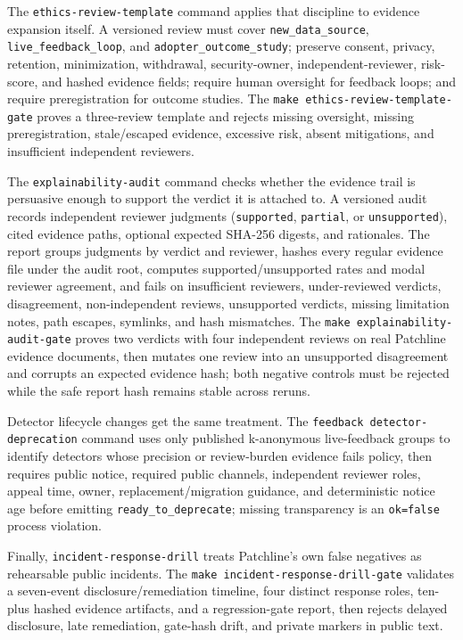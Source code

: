 \documentclass[11pt]{article}
\newcommand{\code}[1]{\texttt{#1}}
\newcommand{\gate}[1]{\texttt{make #1}}
\begin{document}
The \code{ethics-review-template} command applies that discipline to evidence expansion itself. A
versioned review must cover \code{new\_data\_source}, \code{live\_feedback\_loop}, and
\code{adopter\_outcome\_study}; preserve consent, privacy, retention, minimization, withdrawal,
security-owner, independent-reviewer, risk-score, and hashed evidence fields; require human oversight
for feedback loops; and require preregistration for outcome studies. The
\gate{ethics-review-template-gate} proves a three-review template and rejects missing oversight,
missing preregistration, stale/escaped evidence, excessive risk, absent mitigations, and insufficient
independent reviewers.

The \code{explainability-audit} command checks whether the evidence trail is persuasive enough to
support the verdict it is attached to. A versioned audit records independent reviewer judgments
(\code{supported}, \code{partial}, or \code{unsupported}), cited evidence paths, optional expected
SHA-256 digests, and rationales. The report groups judgments by verdict and reviewer, hashes every
regular evidence file under the audit root, computes supported/unsupported rates and modal reviewer
agreement, and fails on insufficient reviewers, under-reviewed verdicts, disagreement, non-independent
reviews, unsupported verdicts, missing limitation notes, path escapes, symlinks, and hash mismatches.
The \gate{explainability-audit-gate} proves two verdicts with four independent reviews on real
Patchline evidence documents, then mutates one review into an unsupported disagreement and corrupts an
expected evidence hash; both negative controls must be rejected while the safe report hash remains
stable across reruns.

Detector lifecycle changes get the same treatment. The \code{feedback detector-deprecation} command
uses only published k-anonymous live-feedback groups to identify detectors whose precision or
review-burden evidence fails policy, then requires public notice, required public channels, independent
reviewer roles, appeal time, owner, replacement/migration guidance, and deterministic notice age before
emitting \code{ready\_to\_deprecate}; missing transparency is an \code{ok=false} process violation.

Finally, \code{incident-response-drill} treats Patchline's own false negatives as rehearsable public
incidents. The \gate{incident-response-drill-gate} validates a seven-event disclosure/remediation
timeline, four distinct response roles, ten-plus hashed evidence artifacts, and a regression-gate report,
then rejects delayed disclosure, late remediation, gate-hash drift, and private markers in public text.
\end{document}
